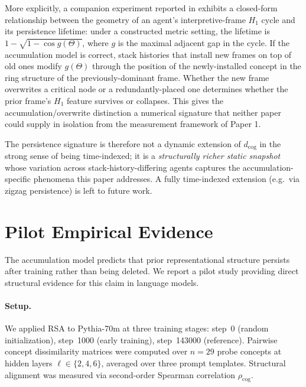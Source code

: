 \documentclass[12pt]{article}
\begin{document}
More explicitly, a companion experiment reported in
\cite[App.~\ref{app:overwrite-h1}]{minamoto2026overwrite} exhibits
a closed-form relationship between the geometry of an agent's
interpretive-frame $H_1$ cycle and its persistence lifetime: under
a constructed metric setting, the lifetime is
$1 - \sqrt{1 - \cos g(\Theta)}$, where $g$ is the maximal adjacent
gap in the cycle. If the accumulation model is correct, stack
histories that install new frames on top of old ones modify
$g(\Theta)$ through the position of the newly-installed concept
in the ring structure of the previously-dominant frame. Whether
the new frame overwrites a critical node or a redundantly-placed
one determines whether the prior frame's $H_1$ feature survives or
collapses. This gives the accumulation/overwrite distinction a
numerical signature that neither paper could supply in isolation
from the measurement framework of Paper 1.

The persistence signature is therefore not a dynamic extension of
$d_\mathrm{cog}$ in the strong sense of being time-indexed; it is
a \emph{structurally richer static snapshot} whose variation across
stack-history-differing agents captures the accumulation-specific
phenomena this paper addresses. A fully time-indexed extension
(e.g.\ via zigzag persistence) is left to future work.

\section{Pilot Empirical Evidence}
\label{sec:pilot}

The accumulation model predicts that prior representational structure
persists after training rather than being deleted.
We report a pilot study providing direct structural evidence for
this claim in language models.

\paragraph{Setup.}
We applied RSA to Pythia-70m \cite{biderman2023} at three training
stages: step~0 (random initialization), step~1000 (early training),
step~143000 (reference).
Pairwise concept dissimilarity matrices were computed over
$n = 29$ probe concepts at hidden layers $\ell \in \{2, 4, 6\}$,
averaged over three prompt templates.
Structural alignment was measured via second-order Spearman
correlation $\rho_\mathrm{cog}$.
\end{document}
